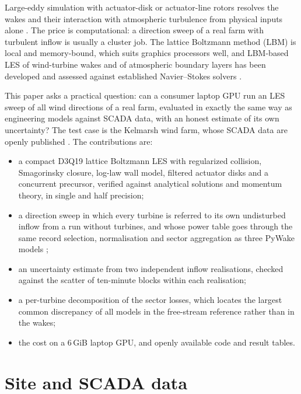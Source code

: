 \documentclass[11pt,a4paper]{article}
\begin{document}
Large-eddy simulation with actuator-disk or actuator-line rotors resolves the wakes and their interaction with
atmospheric turbulence from physical inputs alone \citep{calaf2010les,stevens2017review,porteagel2020review}. The
price is computational: a direction sweep of a real farm with turbulent inflow is usually a cluster job. The
lattice Boltzmann method (LBM) is local and memory-bound, which suits graphics processors well, and LBM-based LES
of wind-turbine wakes and of atmospheric boundary layers has been developed and assessed against established
Navier--Stokes solvers \citep{asmuth2020actuator,asmuth2021wall}.

This paper asks a practical question: can a consumer laptop GPU run an LES sweep of all wind directions of a real
farm, evaluated in exactly the same way as engineering models against SCADA data, with an honest estimate of its
own uncertainty? The test case is the Kelmarsh wind farm, whose SCADA data are openly published
\citep{plumley2025kelmarsh}. The contributions are:
\begin{itemize}
  \item a compact D3Q19 lattice Boltzmann LES with regularized collision, Smagorinsky closure, log-law wall model,
        filtered actuator disks and a concurrent precursor, verified against analytical solutions and momentum
        theory, in single and half precision;
  \item a direction sweep in which every turbine is referred to its own undisturbed inflow from a run without
        turbines, and whose power table goes through the same record selection, normalisation and sector
        aggregation as three PyWake models \citep{pedersen2019pywake};
  \item an uncertainty estimate from two independent inflow realisations, checked against the scatter of
        ten-minute blocks within each realisation;
  \item a per-turbine decomposition of the sector losses, which locates the largest common discrepancy of all
        models in the free-stream reference rather than in the wakes;
  \item the cost on a 6\,GiB laptop GPU, and openly available code and result tables.
\end{itemize}

\section{Site and SCADA data}
\label{sec:data}
\end{document}

